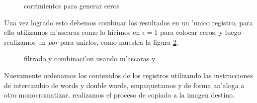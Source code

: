 \begin{figure}[h!]
\caption{corrimientos para generar ceros}
\label{est:m-siete}
\end{figure}

Una vez logrado esto debemos combinar los resultados en un 'unico registro, para ello utilizamos m'ascaras como lo hicimos en $\epsilon= 1$ para colocar ceros, y luego realizamos un \textit{por} para unirlos, como muestra la figura \ref{est:m-ocho}.

\begin{figure}[h!]
\caption{filtrado y combinaci'on usando m'ascaras  y }
\label{est:m-ocho}
\end{figure}

Nuevamente ordenamos los contenidos de los registros utilizando las instrucciones de intercambio de words y double words, empaquetamos y de forma an'aloga a otro monocromatizar, realizamos el proceso de copiado a la imagen destino. 


 
 

